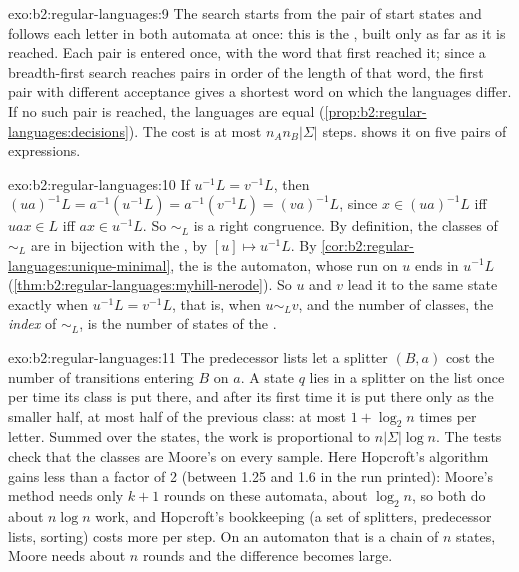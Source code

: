 \begin{solution}{exo:b2:regular-languages:9}
The search starts from the pair of start states and follows each letter in both automata at once: this is the , built only as far as it is reached. Each pair is entered once, with the word that first reached it; since a
breadth-first search reaches pairs in order of the length of that word, the first pair with different acceptance
gives a shortest word on which the languages differ. If no such pair is reached, the languages are equal
(\cref{prop:b2:regular-languages:decisions}). The cost is at most $n_A n_B |\Sigma|$ steps. 
shows it on five pairs of expressions.
\end{solution}

\begin{solution}{exo:b2:regular-languages:10}
If $u^{-1}L = v^{-1}L$, then $(ua)^{-1}L = a^{-1}(u^{-1}L) = a^{-1}(v^{-1}L) = (va)^{-1}L$, since $x \in (ua)^{-1}L$
iff $uax \in L$ iff $ax \in u^{-1}L$. So $\sim_L$ is a right congruence. By definition, the classes of $\sim_L$ are in
bijection with the , by $[u] \mapsto u^{-1}L$. By \cref{cor:b2:regular-languages:unique-minimal}, the  is the  automaton, whose run on $u$ ends in $u^{-1}L$
(\cref{thm:b2:regular-languages:myhill-nerode}). So $u$ and $v$ lead it to the same state exactly when $u^{-1}L =
v^{-1}L$, that is, when $u \sim_L v$, and the number of classes, the \emph{index} of $\sim_L$, is the number of states
of the .
\end{solution}

\begin{solution}{exo:b2:regular-languages:11}
The predecessor lists  let a splitter $(B, a)$ cost the number of transitions entering $B$ on $a$. A state
$q$ lies in a splitter on the list once per time its class is put there, and after its first time it is put there
only as the smaller half, at most half of the previous class: at most $1 + \log_2 n$ times per letter. Summed over the
states, the work is proportional to $n|\Sigma| \log n$. The tests check that the classes are Moore's on every sample.
Here Hopcroft's algorithm gains less than a factor of 2 (between 1.25 and 1.6 in the run printed): Moore's method needs only $k + 1$ rounds on these automata, about $\log_2 n$, so both do about $n \log
n$ work, and Hopcroft's bookkeeping (a set of splitters, predecessor lists, sorting) costs more per step. On an automaton that is a chain of $n$ states, Moore needs about $n$ rounds and the
difference becomes large.
\end{solution}

